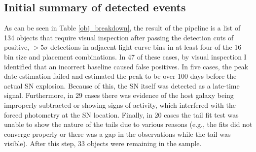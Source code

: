 \documentclass[a4paper,oneside,12pt, class=Latex/Classes/PhDthesisPSnPDF, crop=false]{standalone}
\begin{document}
\subsection{Initial summary of detected events}
\label{results_summary}
As can be seen in Table \ref{obj_breakdown}, the result of the pipeline is a list of 134 objects that require visual inspection after passing the detection cuts of positive, $>5\sigma$ detections in adjacent light curve bins in at least four of the 16 bin size and placement combinations. In 47 of these cases, by visual inspection I identified that an incorrect baseline caused false positives. In five cases, the peak date estimation failed and estimated the peak to be over 100 days before the actual SN explosion. Because of this, the SN itself was detected as a late-time signal. Furthermore, in 29 cases there was evidence of the host galaxy being improperly subtracted or showing signs of activity, which interfered with the forced photometry at the SN location. Finally, in 20 cases the tail fit test was unable to show the nature of the tails due to various reasons (e.g., the fits did not converge properly or there was a gap in the observations while the tail was visible). After this step, 33 objects were remaining in the sample.
\end{document}

